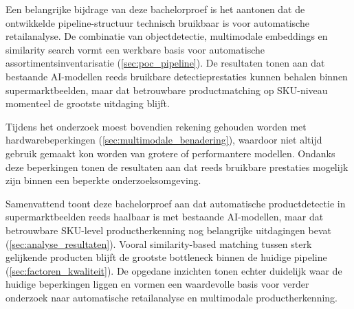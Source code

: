 Een belangrijke bijdrage van deze bachelorproef is het aantonen dat de ontwikkelde pipeline-structuur technisch bruikbaar is voor automatische retailanalyse. De combinatie van objectdetectie, multimodale embeddings en similarity search vormt een werkbare basis voor automatische assortimentsinventarisatie (\ref{sec:poc_pipeline}). De resultaten tonen aan dat bestaande AI-modellen reeds bruikbare detectieprestaties kunnen behalen binnen supermarktbeelden, maar dat betrouwbare productmatching op SKU-niveau momenteel de grootste uitdaging blijft.

Tijdens het onderzoek moest bovendien rekening gehouden worden met hardwarebeperkingen (\ref{sec:multimodale_benadering}), waardoor niet altijd gebruik gemaakt kon worden van grotere of performantere modellen. Ondanks deze beperkingen tonen de resultaten aan dat reeds bruikbare prestaties mogelijk zijn binnen een beperkte onderzoeksomgeving.

Samenvattend toont deze bachelorproef aan dat automatische productdetectie in supermarktbeelden reeds haalbaar is met bestaande AI-modellen, maar dat betrouwbare SKU-level productherkenning nog belangrijke uitdagingen bevat (\ref{sec:analyse_resultaten}). Vooral similarity-based matching tussen sterk gelijkende producten blijft de grootste bottleneck binnen de huidige pipeline (\ref{sec:factoren_kwaliteit}). De opgedane inzichten tonen echter duidelijk waar de huidige beperkingen liggen en vormen een waardevolle basis voor verder onderzoek naar automatische retailanalyse en multimodale productherkenning.